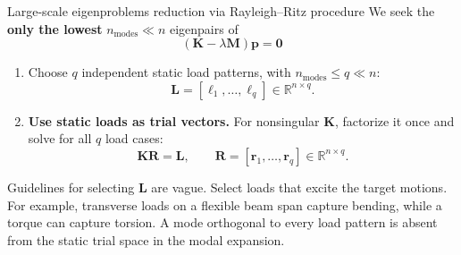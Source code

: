 \documentclass[aspectratio=169]{beamer}
\begin{document}
\begin{frame}{Large-scale eigenproblems reduction via Rayleigh--Ritz procedure}
  \small
  We seek the \textbf{only the lowest} $n_{\mathrm{modes}}\ll n$ eigenpairs of
  $$(\mathbf K - \lambda \mathbf{M})\mathbf p=\mathbf 0$$
  \vspace{-0.6cm}
  \begin{enumerate}
    \item  Choose $q$ independent static load patterns, with $n_{\mathrm{modes}}\le q\ll n$:
          \[
            \mathbf L=[\boldsymbol\ell_1,\ldots,\boldsymbol\ell_q]\in\mathbb R^{n\times q}.
          \]
    \item \textbf{Use static loads as trial vectors.} For nonsingular $\mathbf K$, factorize it once and solve for all $q$ load cases:
          \[
            \mathbf K\mathbf R=\mathbf L,\qquad
            \mathbf R=[\mathbf r_1,\ldots,\mathbf r_q]\in\mathbb R^{n\times q}.
          \]
  \end{enumerate}
  \begin{block}{}
    Guidelines for selecting $\mathbf L$ are vague. Select loads that excite the target motions. For example, transverse loads on a flexible beam span capture bending, while a torque can capture torsion. A mode orthogonal to every load pattern is absent from the static trial space in the modal expansion.
  \end{block}

\end{frame}
\end{document}
